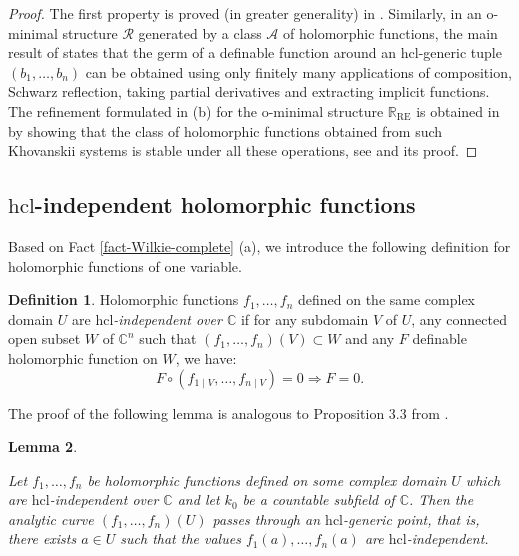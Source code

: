\documentclass[12pt]{amsart}
\theoremstyle{definition}
\newtheorem{defn}{Definition}[section]
\theoremstyle{plain}
\newtheorem{lem}[defn]{Lemma}
\theoremstyle{exampstyle}\newtheorem{thmx}{Theorem}
\theoremstyle{exampstyle}\newtheorem{thmxbis}{Theorem}
\begin{document}
\begin{proof} 
The first property is proved (in greater generality) in \cite[Subsection 2.2]{Wilkie}. Similarly, in an o-minimal structure $\mathcal R$ generated by a class $\mathcal A$ of holomorphic functions, the main result of \cite{Wilkie} states that the germ of a definable function around an $\mathrm{hcl}$-generic tuple $(b_1,\ldots,b_n)$  can be obtained using only finitely many applications of composition, Schwarz reflection, taking partial derivatives and extracting implicit functions. The refinement formulated in (b) for the o-minimal structure $\mathbb{R}_{\mathrm{RE}}$ is obtained in \cite{LGKJS} by showing that the class of holomorphic functions obtained from such Khovanskii systems is stable under all these operations, see \cite[Lemma 4.3]{LGKJS} and its proof. 
\end{proof} 

\subsection{$\mathrm{hcl}$-independent holomorphic functions} 
Based on Fact \ref{fact-Wilkie-complete} (a), we introduce the following definition for holomorphic functions of one variable.

\begin{defn} 
Holomorphic functions $f_1,\ldots,f_n$ defined on the same complex domain $U$ are {\em $\mathrm{hcl}$-independent over $\mathbb{C}$} if for any subdomain $V$ of $U$, any connected open subset $W$ of $\mathbb{C}^n$  such that $(f_1,\ldots,f_n)(V) \subset W$ and any $F$ definable holomorphic function on $W$, we have:
$$ F \circ (f_{1\mid V}, \ldots, f_{n \mid V}) = 0 \Rightarrow F = 0.$$
\end{defn}


The proof of the following lemma is analogous to Proposition 3.3 from \cite{Jones-Kirby-Servi}.


\begin{lem} \label{lemma-generic-points}

Let $f_1,\ldots,f_n$ be holomorphic functions defined on some complex domain $U$ which are $\mathrm{hcl}$-independent over $\mathbb{C}$ and let $k_0$ be a countable subfield of $\mathbb{C}$. Then the analytic curve $(f_1,\ldots,f_n)(U)$ passes through an $\mathrm{hcl}$-generic point, that is, there exists $a \in U$ such that the values
$f_1(a),\ldots,f_n(a)$ are $\mathrm{hcl}$-independent.
\end{lem} 
\end{document}
